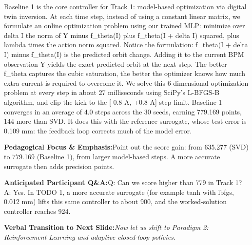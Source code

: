 \documentclass[11pt,a4paper]{article}
\begin{document}
\begin{tcolorbox}[colback=white,colframe=primaryblue,title={\footnotesize\bfseries\color{white}Spoken Presenter Script},fontupper=\small,left=6pt,right=6pt,top=3pt,bottom=3pt,boxrule=0.8pt,arc=2.5pt]
Baseline 1 is the core controller for Track 1: model-based optimization via digital twin inversion. At each time step, instead of using a constant linear matrix, we formulate an online optimization problem using our trained MLP: minimize over delta I the norm of Y minus f\_theta(I) plus f\_theta(I + delta I) squared, plus lambda times the action norm squared. Notice the formulation: f\_theta(I + delta I) minus f\_theta(I) is the predicted orbit change. Adding it to the current BPM observation Y yields the exact predicted orbit at the next step. The better f\_theta captures the cubic saturation, the better the optimizer knows how much extra current is required to overcome it. We solve this 6-dimensional optimization problem at every step in about 27 milliseconds using SciPy's L-BFGS-B algorithm, and clip the kick to the [-0.8 A, +0.8 A] step limit. Baseline 1 converges in an average of 4.0 steps across the 30 seeds, earning 779.169 points, 144 more than SVD. It does this with the reference surrogate, whose test error is 0.109 mm: the feedback loop corrects much of the model error.
\end{tcolorbox}
\vspace{0.2em}
\begin{tcolorbox}[colback=lightbg,colframe=bordergray,left=6pt,right=6pt,top=3pt,bottom=3pt,boxrule=0.6pt,arc=2.5pt]
\small
\noindent\textbf{\color{navy}Pedagogical Focus \& Emphasis:}\enspace Point out the score gain: from 635.277 (SVD) to 779.169 (Baseline 1), from larger model-based steps. A more accurate surrogate then adds precision points.\par\vspace{0.3em}
\noindent\textbf{\color{successgreen}Anticipated Participant Q\&A:}\enspace Q: Can we score higher than 779 in Track 1? A: Yes. In TODO 1, a more accurate surrogate (for example tanh with lbfgs, 0.012 mm) lifts this same controller to about 900, and the worked-solution controller reaches 924.\par\vspace{0.3em}
\noindent\textbf{\color{accent}Verbal Transition to Next Slide:}\enspace \emph{Now let us shift to Paradigm 2: Reinforcement Learning and adaptive closed-loop policies.}
\end{tcolorbox}
\clearpage
\hypertarget{slide.24}{}
\end{document}
